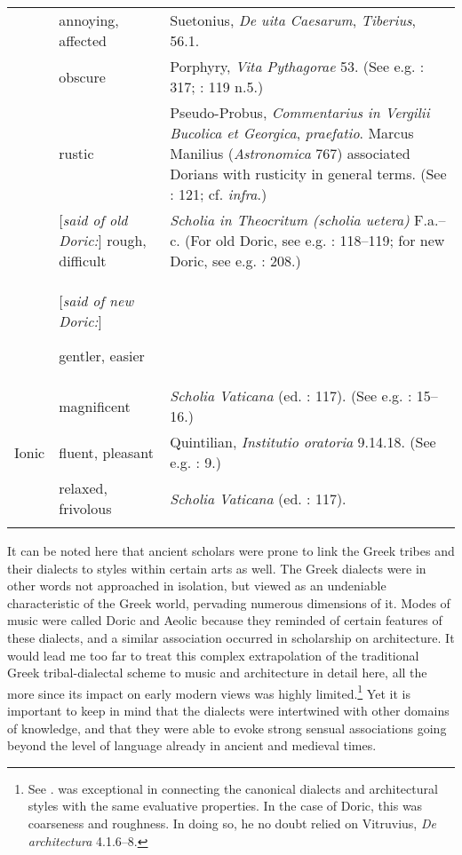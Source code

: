 \begin{table}
\begin{tabularx}{\textwidth}{XXX}
& annoying, affected & Suetonius, \textit{De uita Caesarum}, \textit{Tiberius}, 56.1.\\
 & obscure & Porphyry, \textit{Vita Pythagorae} 53. (See e.g. \citealt{Bentley1699}: 317; \citealt{Mazzocchi1754}: 119 n.5.)\\
 & rustic & Pseudo-Probus, \textit{Commentarius in Vergilii Bucolica et Georgica}, \textit{praefatio}. Marcus Manilius (\textit{Astronomica} 767) associated Dorians with rusticity in general terms. (See \citealt{Rapin1659}: 121; cf. \textit{infra}.)\\
 & [\textit{said of old Doric:}] rough, difficult & \textit{Scholia in Theocritum (scholia uetera)} F.a.–c. (For old Doric, see e.g. \citealt{Mazzocchi1754}: 118–119; for new Doric, see e.g. \citealt{Valckenaer1773}: 208.)\\
 & [\textit{said of new Doric:}]

gentler, easier & \\
 & magnificent & \textit{Scholia Vaticana} (ed. \citealt{Hilgard1901}: 117). (See e.g. \citealt{Estienne1581}: 15–16.)\\
\multicolumn{1}{c}{Ionic} & fluent, pleasant & Quintilian, \textit{Institutio oratoria} 9.14.18. (See e.g. \citealt{Munthe1748}: 9.)\\
& relaxed, frivolous & \textit{Scholia Vaticana} (ed. \citealt{Hilgard1901}: 117).\\

\lspbottomrule
\end{tabularx}
\end{table}

It can be noted here that ancient scholars were prone to link the Greek tribes and their dialects to styles within certain arts as well. The Greek dialects were in other words not approached in isolation, but viewed as an undeniable characteristic of the Greek world, pervading numerous dimensions of it. Modes of music were called Doric and Aeolic because they reminded of certain features of these dialects, and a similar association occurred in scholarship on architecture. It would lead me too far to treat this complex extrapolation of the traditional Greek tribal-dialectal scheme to music and architecture in detail here, all the more since its impact on early modern views was highly limited.\footnote{See \citet{Cassio1984}. \citet[118]{Mazzocchi1754} was exceptional in connecting the canonical dialects and architectural styles with the same evaluative properties. In the case of Doric, this was coarseness and roughness. In doing so, he no doubt relied on Vitruvius, \textit{De architectura} 4.1.6–8.} Yet it is important to keep in mind that the dialects were intertwined with other domains of knowledge, and that they were able to evoke strong sensual associations going beyond the level of language already in ancient and medieval times.

